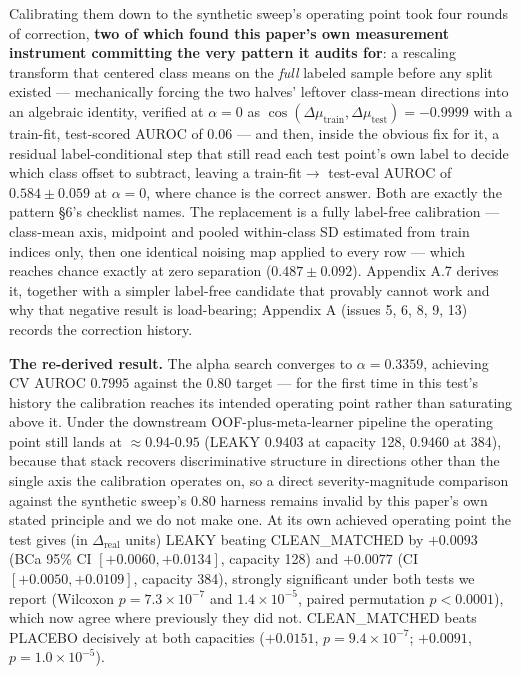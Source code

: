 \documentclass[10pt]{article} %
\begin{document}
Calibrating them down to the synthetic sweep's operating point took four rounds
of correction, \textbf{two of which found this paper's own measurement
instrument committing the very pattern it audits for}: a rescaling transform
that centered class means on the \emph{full} labeled sample before any split
existed --- mechanically forcing the two halves' leftover class-mean directions
into an algebraic identity, verified at $\alpha=0$ as
$\cos(\Delta\mu_{\text{train}},\Delta\mu_{\text{test}})=-0.9999$ with a
train-fit, test-scored AUROC of $0.06$ --- and then, inside the obvious fix for
it, a residual label-conditional step that still read each test point's own
label to decide which class offset to subtract, leaving a train-fit$\to$
test-eval AUROC of $0.584\pm0.059$ at $\alpha=0$, where chance is the correct
answer. Both are exactly the pattern §6's checklist names. The replacement is a
fully label-free calibration --- class-mean axis, midpoint and pooled
within-class SD estimated from train indices only, then one identical noising
map applied to every row --- which reaches chance exactly at zero separation
($0.487\pm0.092$). Appendix A.7 derives it, together with a simpler label-free
candidate that provably cannot work and why that negative result is
load-bearing; Appendix A (issues 5, 6, 8, 9, 13) records the correction
history.

\textbf{The re-derived result.} The alpha search converges to $\alpha=0.3359$,
achieving CV AUROC $0.7995$ against the $0.80$ target --- for the first time in
this test's history the calibration reaches its intended operating point rather
than saturating above it. Under the downstream OOF-plus-meta-learner pipeline
the operating point still lands at $\approx0.94$-$0.95$ (LEAKY $0.9403$ at
capacity 128, $0.9460$ at 384), because that stack recovers discriminative
structure in directions other than the single axis the calibration operates on,
so a direct severity-magnitude comparison against the synthetic sweep's $0.80$
harness remains invalid by this paper's own stated principle and we do not make
one. At its own achieved operating point the test gives (in
$\Delta_{\text{real}}$ units) LEAKY beating CLEAN\_MATCHED by $+0.0093$ (BCa
95\% CI $[+0.0060,+0.0134]$, capacity 128) and $+0.0077$ (CI
$[+0.0050,+0.0109]$, capacity 384), strongly significant under both tests we
report (Wilcoxon $p=7.3\times10^{-7}$ and $1.4\times10^{-5}$, paired
permutation $p<0.0001$), which now agree where previously they did not.
CLEAN\_MATCHED beats PLACEBO decisively at both capacities ($+0.0151$,
$p=9.4\times10^{-7}$; $+0.0091$, $p=1.0\times10^{-5}$).
\end{document}
